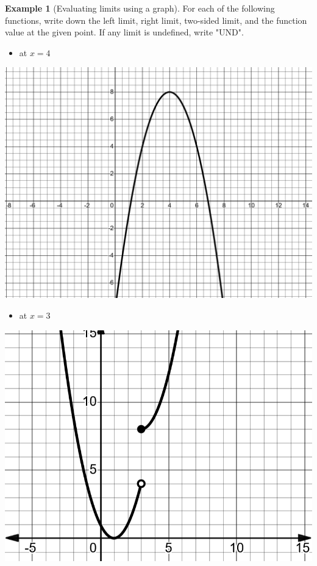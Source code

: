 \documentclass[
]{book}
\providecommand{\tightlist}{%
  \setlength{\itemsep}{0pt}\setlength{\parskip}{0pt}}
\theoremstyle{definition}
\theoremstyle{definition}
\newtheorem{example}{Example}[chapter]
\theoremstyle{definition}
\theoremstyle{definition}
\theoremstyle{remark}
\begin{document}
\begin{example}[Evaluating limits using a graph]
\protect\hypertarget{exm:ex315}{}\label{exm:ex315}For each of the following functions, write down the left limit, right limit, two-sided limit, and the function value at the given point. If any limit is undefined, write "UND".

\begin{itemize}
\tightlist
\item
  at \(x = 4\)
\end{itemize}

\includegraphics{fig/fig7.png}

\begin{itemize}
\tightlist
\item
  at \(x = 3\)
\end{itemize}

\includegraphics{fig/fig8.png}


\end{example}
\end{document}

